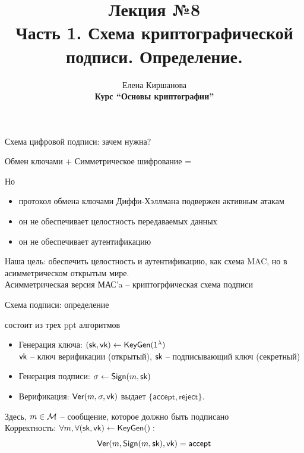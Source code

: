 \documentclass[usenames,dvipsnames,8pt,aspectratio=169]{beamer}
\title{Лекция №8 \\[10pt]
	Часть 1. Схема криптографической подписи. Определение. }
\date{ Елена Киршанова \\  \textbf{Курс ``Основы криптографии''} \\  }
\begin{document}
	
\begin{frame}
	\titlepage
\end{frame}

\begin{frame}{Схема цифровой подписи: зачем нужна?}
	\large 
	\begin{center}
Обмен ключами + Симметрическое шифрование =  {\color{Orange}{конфидециальность} } 
	\end{center}
Но
	\begin{itemize}
		\itemsep 10pt
		\item протокол обмена ключами Диффи-Хэллмана{\color{Orange} подвержен активным атакам} 
		\item  он не обеспечивает {\color{Orange} целостность} передаваемых данных
		\item он не обеспечивает {\color{Orange} аутентификацию}
	\end{itemize}

\vspace{15pt}

Наша цель: обеспечить целостность и аутентификацию, как схема MAC,  но в асимметрическом  {\color{Orange} открытым} мире.\\[10pt]


\Large Асимметрическая версия МАС'a -- {\color{Orange} криптогрфическая схема подписи}
\end{frame}



\begin{frame}{Схема подписи: определение}
\Large

{\color{Orange}{Схема подписи}} состоит из трех ppt алгоритмов
\begin{itemize}
	\itemsep 10pt
	\item Генерация ключа: $(\textsf{sk}, \textsf{vk}) \leftarrow \textsf{KeyGen}(1^\lambda)$ \\
	$\textsf{vk}$ -- ключ верификации (открытый), $\textsf{sk}$ -- подписывающий ключ (секретный)
	\item Генерация подписи: $\sigma \leftarrow \textsf{Sign}(m, \textsf{sk})$
	\item Верификация: $\textsf{Ver}(m, \sigma, \textsf{vk})$ выдает $\{\mathsf{accept}, \mathsf{reject}  \}$.
\end{itemize}
\vspace{15pt}
Здесь,  $m \in \mathcal{M}$ -- сообщение, которое должно быть подписано\\[10pt]

{\color{Orange}Корректность}: $\forall m, \forall (\textsf{sk}, \textsf{vk}) \leftarrow \textsf{KeyGen}():$ 
\[
	\textsf{Ver}(m, \textsf{Sign}(m, \textsf{sk}), \textsf{vk})  = \mathsf{accept}
\]
\end{frame}
\end{document}
